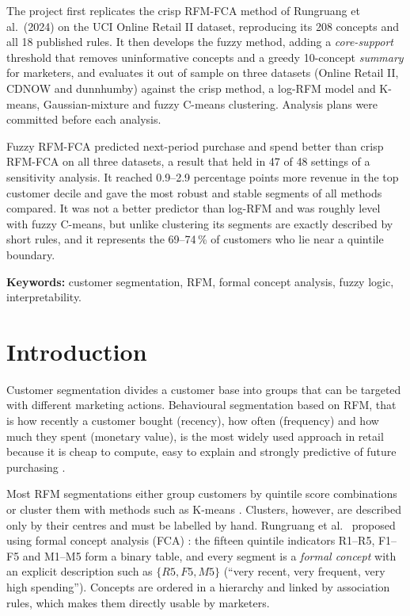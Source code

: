 \documentclass[11pt,a4paper]{article}
\begin{document}
The project first replicates the crisp RFM-FCA method of Rungruang et al.\ (2024) on the UCI Online Retail II dataset, reproducing its 208 concepts and all 18 published rules. It then develops the fuzzy method, adding a \emph{core-support} threshold that removes uninformative concepts and a greedy 10-concept \emph{summary} for marketers, and evaluates it out of sample on three datasets (Online Retail II, CDNOW and dunnhumby) against the crisp method, a log-RFM model and K-means, Gaussian-mixture and fuzzy C-means clustering. Analysis plans were committed before each analysis.

Fuzzy RFM-FCA predicted next-period purchase and spend better than crisp RFM-FCA on all three datasets, a result that held in 47 of 48 settings of a sensitivity analysis. It reached 0.9--2.9 percentage points more revenue in the top customer decile and gave the most robust and stable segments of all methods compared. It was not a better predictor than log-RFM and was roughly level with fuzzy C-means, but unlike clustering its segments are exactly described by short rules, and it represents the 69--74\,\% of customers who lie near a quintile boundary.

\vspace{0.5em}
\noindent\textbf{Keywords:} customer segmentation, RFM, formal concept analysis, fuzzy logic, interpretability.

\newpage
\tableofcontents
\newpage

\section{Introduction}

Customer segmentation divides a customer base into groups that can be targeted with different marketing actions. Behavioural segmentation based on RFM, that is how recently a customer bought (recency), how often (frequency) and how much they spent (monetary value), is the most widely used approach in retail because it is cheap to compute, easy to explain and strongly predictive of future purchasing \cite{hughes1994,fader2005}.

Most RFM segmentations either group customers by quintile score combinations or cluster them with methods such as K-means \cite{chen2012}. Clusters, however, are described only by their centres and must be labelled by hand. Rungruang et al.\ \cite{rungruang2024} proposed using formal concept analysis (FCA) \cite{ganter1999}: the fifteen quintile indicators R1--R5, F1--F5 and M1--M5 form a binary table, and every segment is a \emph{formal concept} with an explicit description such as $\{R5, F5, M5\}$ (``very recent, very frequent, very high spending''). Concepts are ordered in a hierarchy and linked by association rules, which makes them directly usable by marketers.
\end{document}
